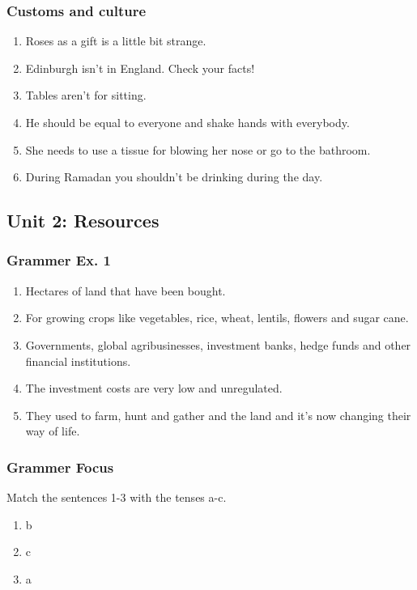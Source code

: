 \documentclass[12pt, a4paper, oneside]{article}
\begin{document}
  \subsubsection{Customs and culture}
  \begin{enumerate}[1.]
    \item Roses as a gift is a little bit strange.
    \item Edinburgh isn't in England. Check your facts!
    \item Tables aren't for sitting.
    \item He should be equal to everyone and shake hands with everybody.
    \item She needs to use a tissue for blowing her nose or go to the bathroom.
    \item During Ramadan you shouldn't be drinking during the day.
  \end{enumerate}

  \newpage
  \subsection{Unit 2: Resources}
  \subsubsection{Grammer Ex. 1}
  \begin{enumerate}[1.]
    \item Hectares of land that have been bought.
    \item For growing crops like vegetables, rice, wheat, lentils, flowers and sugar cane.
    \item Governments, global agribusinesses, investment banks, hedge funds and other financial institutions.
    \item The investment costs are very low and unregulated.
    \item They used to farm, hunt and gather and the land and it's now changing their way of life.
  \end{enumerate}

  \subsubsection{Grammer Focus}
  Match the sentences 1-3 with the tenses a-c.
  \begin{enumerate}[1.] 
    \item b
    \item c
    \item a
  \end{enumerate}
\end{document}
